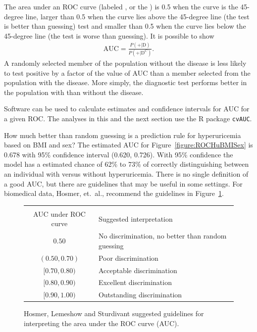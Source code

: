 The area under an ROC curve (labeled ,   or the ) is 0.5 when the curve is the 45-degree line, larger than 0.5 when the curve lies above the 45-degree line (the test is better than guessing) test and smaller than 0.5 when the curve lies below the 45-degree line (the test is worse than guessing).  It is possible to show 
\begin{align*}
\text{AUC} = \frac{P(+ | \text{D})}{P(+| \text{D}^C)}.
\end{align*}
A randomly selected member of the population without the disease is less likely to test positive by a factor of the value of AUC than a member selected from the population with the disease. More simply, the diagnostic test performs better in the population with than without the disease.

Software can be used to calculate estimates and confidence intervals for AUC for a given ROC.  The analyses in this and the next section use the \textsf{R} package \texttt{cvAUC}.

How much better than random guessing is a prediction rule for hyperuricemia based on BMI and sex? The estimated AUC for Figure~\ref{figure:ROCHuBMISex} is 0.678 with 95\% confidence interval (0.620, 0.726).  With 95\% confidence the model has a estimated chance of 62\% to 73\% of correctly distinguishing between an individual with versus  without hyperuricemia.  There is no single definition of a good AUC, but there are guidelines that may be useful in some settings.  For biomedical data, Hosmer, et.\ al., recommend the guidelines in Figure~\ref{figure:AUCGuidelines}.

\begin{figure}[ht]
\centering
  \begin{tabular}{cl}
  \hline \\
AUC under ROC curve & Suggested interpretation  \\
  \hline
    $0.50$ & No discrimination, no better than random guessing   \\
    $(0.50, 0.70)$ & Poor discrimination \\
    $[0.70, 0.80)$ & Acceptable discrimination   \\
    $[0.80, 0.90)$ &  Excellent discrimination  \\
    $[0.90, 1.00)$ & Outstanding discrimination   \\
   \hline
\end{tabular}
  \caption{Hosmer, Lemeshow and Sturdivant suggested guidelines for interpreting the area under the ROC curve (AUC).}
\label{figure:AUCGuidelines}
\end{figure}


